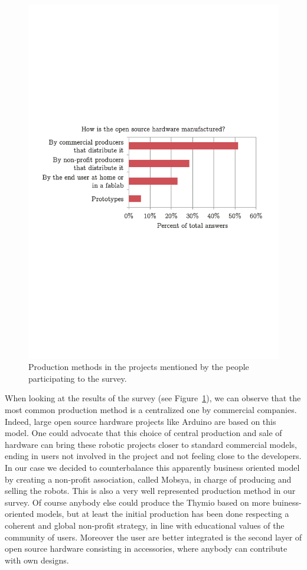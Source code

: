 \documentclass[letterpaper, 10 pt, conference]{ieeeconf}  %
\begin{document}
\begin{figure}
\centering
\includegraphics[width=\columnwidth]{figures/manufacturing}
\caption{Production methods in the projects mentioned by the people participating to the survey.}
\label{fig:production}
\end{figure}

When looking at the results of the survey (see Figure~\ref{fig:production}), we can observe that the most common production method is a centralized one by commercial companies.
Indeed, large open source hardware projects like Arduino are based on this model.
One could advocate that this choice of central production and sale of hardware can bring these robotic projects closer to standard commercial models, ending in users not involved in the project and not feeling close to the developers.
In our case we decided to counterbalance this apparently business oriented model by creating a non-profit association, called Mobsya, in charge of producing and selling the robots. 
This is also a very well represented production method in our survey.
Of course anybody else could produce the Thymio based on more buiness-oriented models, but at least the initial production has been done respecting a coherent and global non-profit strategy, in line with educational values of the community of users.
Moreover the user are better integrated is the second layer of open source hardware consisting in accessories, where anybody can contribute with own designs.
\end{document}
